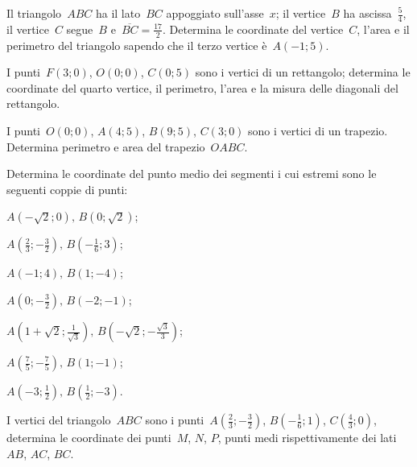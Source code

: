 \begin{esercizio}
\label{ese:8.31}
Il triangolo~$ABC$ ha il lato~$BC$ appoggiato sull'asse~$x$; il vertice~$B$ ha ascissa~$\frac{5}{4}$,
il vertice~$C$ segue~$B$ e~$\overline{BC}=\frac{17}{2}$. Determina le coordinate del vertice~$C$,
l'area e il perimetro del triangolo sapendo che il terzo vertice è~$A(-1;5)$.
\end{esercizio}

\begin{esercizio}
\label{ese:8.32}
I punti~$F(3;0)$, $O(0;0)$, $C(0;5)$ sono i vertici di un rettangolo; determina le coordinate del quarto vertice, il perimetro,
l'area e la misura delle diagonali del rettangolo.
\end{esercizio}

\begin{esercizio}
\label{ese:8.33}
I punti~$O(0;0)$, $A(4;5)$, $B(9;5)$, $C(3;0)$ sono i vertici di un trapezio.
Determina perimetro e area del trapezio~$OABC$.
\end{esercizio}

\begin{esercizio}
\label{ese:8.34}
Determina le coordinate del punto medio dei segmenti i cui estremi sono le seguenti coppie di punti:
\begin{multicols}{2}
 \begin{enumeratea}
\item $A(-\sqrt{2};0)\text{, }B(0;\sqrt{2})$;
\item $A\left(\frac{2}{3};-\frac{3}{2}\right)\text{, }B\left(-{\frac{1}{6}};3\right)$;
\item $A(-1;4)\text{, }B(1;-4)$;
\item $A\left(0;-\frac{3}{2}\right)\text{, }B\left(-2;-1\right)$;
\item $A\left(1+\sqrt{2};\frac{1}{\sqrt{3}}\right)\text{, }B\left(-\sqrt{2};-\frac{\sqrt{3}}{3}\right)$;
\item $A\left(\frac{7}{5};-\frac{7}{5}\right)\text{, }B(1;-1)$;
\item $A\left(-3;\frac{1}{2}\right)\text{, }B\left(\frac{1}{2};-3\right)$.
\end{enumeratea}
\end{multicols}
\end{esercizio}

\begin{esercizio}
\label{ese:8.35}
I vertici del triangolo~$ABC$ sono i punti~$A\left(\frac{2}{3};-\frac{3}{2}\right)$, $B\left(-{\frac{1}{6}};1\right)$,
$C\left(\frac{4}{3};0\right)$, determina le coordinate dei punti~$M$, $N$, $P$, punti medi rispettivamente dei lati
$AB$, $AC$, $BC$.
\end{esercizio}

